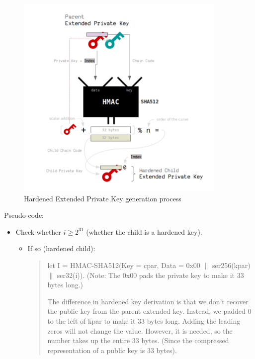 \begin{adjustwidth}{0.5cm}{}
    \begin{figure}[ht!]
        \centering
        \includegraphics[width=0.9\textwidth]{images/hard_private_gen.png}
        \caption[Hardened Extended Private Key generation process]{Hardened Extended Private Key generation process}
        \label{fig:3}
    \end{figure}

    Pseudo-code:

    \begin{itemize}
        \item Check whether $i \geq 2^{31}$ (whether the child is a hardened key).
              \begin{itemize}
                  \item If so (hardened child):
                        \begin{quote}

                            let I = HMAC-SHA512(Key = cpar, Data = 0x00 $\parallel$ ser256(kpar) $\parallel$ ser32(i)). (Note: The 0x00 pads the private key to make it 33 bytes long.)

                            The difference in hardened key derivation is that we don't recover the public key from the parent extended key. Instead, we padded 0 to the left of kpar to make it 33 bytes long. Adding the leading zeros will not change the value. However, it is needed, so the number takes up the entire 33 bytes. (Since the compressed representation of a public key is 33 bytes).
                        \end{quote}



\end{itemize}
\end{itemize}
\end{adjustwidth}
